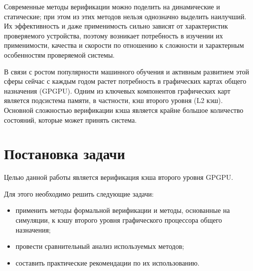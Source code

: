 Современные методы верификации можно поделить на динамические и статические; при этом из этих методов нельзя однозначно выделить наилучший. Их эффективность и даже применимость сильно зависят от характеристик проверяемого устройства, поэтому возникает потребность в изучении их применимости, качества и скорости по отношению к сложности и характерным особенностям проверяемой системы. 

В связи с ростом популярности машинного обучения и активным развитием этой сферы сейчас с каждым годом растет потребность в графических картах общего назначения (GPGPU). Одним из ключевых компонентов графических карт является подсистема памяти, в частности, кэш второго уровня (L2 кэш). Основной сложностью верификации кэша является крайне большое количество состояний, которые может принять система.

\newpage
\section{Постановка задачи}

\tab Целью данной работы является верификация кэша второго уровня GPGPU. 

Для этого необходимо решить следующие задачи: 

\begin{itemize}
	\item применить методы формальной верификации и методы, основанные на симуляции, к кэшу второго уровня графического процессора общего назначения;
	\item провести сравнительный анализ используемых методов;
	\item составить практические рекомендации по их использованию.
\end{itemize}
